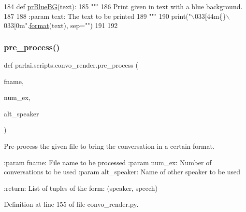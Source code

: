 \begin{DoxyCode}
184 \textcolor{keyword}{def }\hyperlink{namespaceparlai_1_1scripts_1_1convo__render_a21a7681b9803eb6994ac72c7d480cb94}{prBlueBG}(text):
185     \textcolor{stringliteral}{"""}
186 \textcolor{stringliteral}{    Print given in text with a blue background.}
187 \textcolor{stringliteral}{}
188 \textcolor{stringliteral}{    :param text: The text to be printed}
189 \textcolor{stringliteral}{    """}
190     print(\textcolor{stringliteral}{"\(\backslash\)033[44m\{\}\(\backslash\)033[0m"}.\hyperlink{namespaceparlai_1_1chat__service_1_1services_1_1messenger_1_1shared__utils_a32e2e2022b824fbaf80c747160b52a76}{format}(text), sep=\textcolor{stringliteral}{""})
191 
192 
\end{DoxyCode}
\mbox{\label{namespaceparlai_1_1scripts_1_1convo__render_a0f0a031443ca797c936d2961a702a45e}} 
\subsubsection{\texorpdfstring{pre\+\_\+process()}{pre\_process()}}
{\footnotesize\ttfamily def parlai.\+scripts.\+convo\+\_\+render.\+pre\+\_\+process (\begin{DoxyParamCaption}\item[{}]{fname,  }\item[{}]{num\+\_\+ex,  }\item[{}]{alt\+\_\+speaker }\end{DoxyParamCaption})}

\begin{DoxyVerb}Pre-process the given file to bring the conversation in a certain format.

:param fname: File name to be processed
:param num_ex: Number of conversations to be used
:param alt_speaker: Name of other speaker to be used

:return: List of tuples of the form: (speaker, speech)
\end{DoxyVerb}
 

Definition at line 155 of file convo\+\_\+render.\+py.


